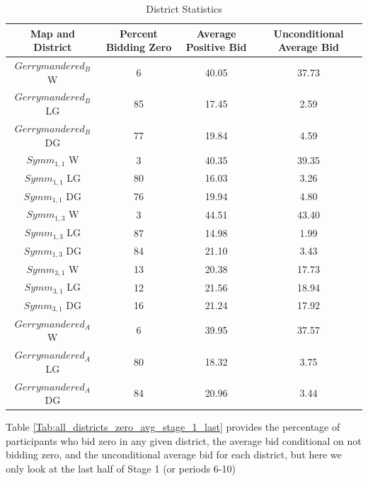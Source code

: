 \documentclass[AER]{AEA}
\begin{document}
\begin{table}
\caption{District Statistics} 
\begin{center}
 \begin{tabular}{|c c c c|} 
 \hline
 Map and District & Percent Bidding Zero & Average Positive Bid & Unconditional Average Bid \\ [0.5ex] 
 \hline
 $Gerrymandered_B$ W & 6 & 40.05 & 37.73 \\
 $Gerrymandered_B$ LG & 85 & 17.45 & 2.59 \\
 $Gerrymandered_B$ DG & 77 & 19.84 & 4.59 \\
  \hline
 $Symm_{1,1}$ W & 3 & 40.35 & 39.35 \\
 $Symm_{1,1}$ LG & 80 & 16.03 & 3.26 \\
 $Symm_{1,1}$ DG & 76 & 19.94 & 4.80 \\
  \hline
 $Symm_{1,3}$ W & 3 & 44.51 & 43.40 \\
 $Symm_{1,3}$ LG & 87 & 14.98 & 1.99 \\
 $Symm_{1,3}$ DG & 84 & 21.10 & 3.43 \\
  \hline
 $Symm_{3,1}$ W & 13 & 20.38 & 17.73 \\
 $Symm_{3,1}$ LG & 12 & 21.56 & 18.94 \\
 $Symm_{3,1}$ DG & 16 & 21.24 & 17.92 \\
  \hline
 $Gerrymandered_A$ W & 6 & 39.95 & 37.57 \\
 $Gerrymandered_A$ LG & 80 & 18.32 & 3.75 \\
 $Gerrymandered_A$ DG & 84 & 20.96 & 3.44 \\
 \hline
\end{tabular}
\label{Tab:all_districts_zero_avg}
\end{center}
\end{table}

Table \ref{Tab:all_districts_zero_avg_stage_1_last} provides the percentage of participants who bid zero in any given district, the average bid conditional on not bidding zero, and the unconditional average bid for each district, but here we only look at the last half of Stage 1 (or periods 6-10)
\end{document}
